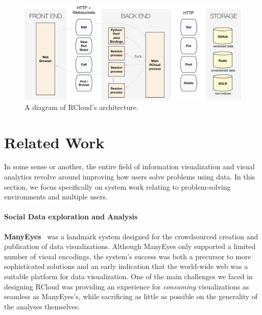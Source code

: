 \begin{figure}
  \centering
\includegraphics[width=.75\linewidth]{fig/system/system.pdf}
\caption{\label{fig:system}A diagram of RCloud's architecture. }
\end{figure}

\section{Related Work}

In some sense or another, the entire field of information
visualization and visual analytics revolve around improving how users
solve problems using data. In this section, we focus specifically on
system work relating to problem-solving environments and multiple users.

\paragraph*{Social Data exploration and Analysis}
{\bf ManyEyes}~\cite{Viegas:2007:MAS} was a landmark system designed
for the crowdsourced creation and publication of data
visualizations. Although ManyEyes only supported a limited number of
visual encodings, the system's success was both a precursor to more
sophisticated solutions and an early indication that the world-wide
web was a suitable platform for data visualization. One of the main
challenges we faced in designing RCloud was providing an experience
for \emph{consuming} visualizations as seamless as ManyEyes's, while
sacrificing as little as possible on the generality of the analyses
themselves.

